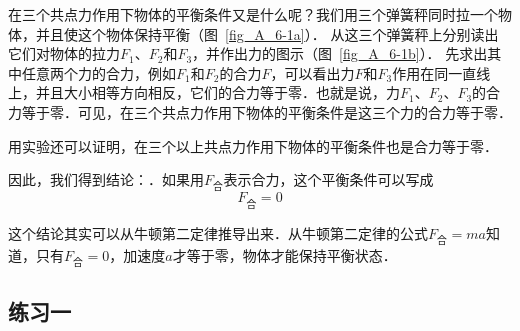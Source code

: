 在三个共点力作用下物体的平衡条件又是什么呢？我们用三个弹簧秤同时拉一个物体，并且使这个物体保持平衡（图~\ref{fig_A_6-1a}）．
从这三个弹簧秤上分别读出它们对物体的拉力$F_1$、$F_2$和$F_3$，并作出力的图示（图~\ref{fig_A_6-1b}）．
先求出其中任意两个力的合力，例如$F_1$和$F_2$的合力$F$，可以看出力$F$和$F_3$作用在同一直线上，并且大小相等方向相反，它们的合力等于零．也就是说，力$F_1$、$F_2$、$F_3$的合力等于零．可见，在三个共点力作用下物体的平衡条件是这三个力的合力等于零．

用实验还可以证明，在三个以上共点力作用下物体的平衡条件也是合力等于零．

因此，我们得到结论：．如果用$F_{\text{合}}$表示合力，这个平衡条件可以写成
\[F_{\text{合}}=0\] 

这个结论其实可以从牛顿第二定律推导出来．从牛顿第二定律的公式$F_{\text{合}}=ma$知道，只有$F_{\text{合}}=0$，加速度$a$才等于零，物体才能保持平衡状态．

\subsection*{练习一}

